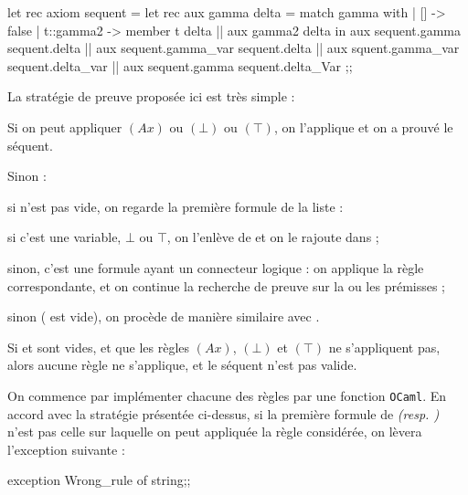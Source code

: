 \documentclass[a4paper,french,bookmarks]{article}
\begin{document}
\begin{enumerate}
        \begin{ocaml}
let rec axiom sequent = 
	let rec aux gamma delta = match gamma with 
		| [] -> false 
		| t::gamma2 -> member t delta 
		|| aux gamma2 delta 
	in aux sequent.gamma sequent.delta 
	|| aux sequent.gamma_var sequent.delta
	|| aux squent.gamma_var sequent.delta_var
	|| aux sequent.gamma sequent.delta_Var
;;
        \end{ocaml}
    \end{enumerate}
    
    La stratégie de preuve proposée ici est très simple :
    \begin{enumerate}
        \itt Si on peut appliquer $(Ax)$ ou $(\bot)$ ou $(\top)$, on l'applique et on a prouvé le séquent.
        
        \itt Sinon :
        \begin{enumerate}
            \itast si  n'est pas vide, on regarde la première formule de la liste :
            \begin{enumerate}
                \ithand si c'est une variable, $\bot$ ou $\top$, on l'enlève de  et on le rajoute dans  ;
                
                \ithand sinon, c'est une formule ayant un connecteur logique : on applique la règle correspondante, et on continue la recherche de preuve sur la ou les prémisses ;
            \end{enumerate}
            
            \itast sinon ( est vide), on procède de manière similaire avec .
        \end{enumerate}
        
        \itt Si  et  sont vides, et que les règles $(Ax)$, $(\bot)$ et $(\top)$ ne s'appliquent pas, alors aucune règle ne s'applique, et le séquent n'est pas valide.
    \end{enumerate}
    
    On commence par implémenter chacune des règles par une fonction \texttt{OCaml}. En accord avec la stratégie présentée ci-dessus, si la première formule de  \emph{(resp. )} n'est pas celle sur laquelle on peut appliquée la règle considérée, on lèvera l'exception suivante :
    
    \begin{ocaml}
exception Wrong_rule of string;;
    \end{ocaml}
    
\end{document}
